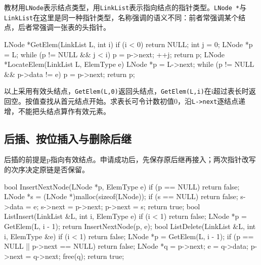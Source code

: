 教材用\texttt{LNode}表示结点类型，用\texttt{LinkList}表示指向结点的指针类型。\texttt{LNode *\allowbreak{}}与\texttt{LinkList}在这里是同一种指针类型，名称强调的语义不同：前者常强调某个结点，后者常强调一张表的头指针。

\par\medskip\noindent\begin{minipage}{\linewidth}
\begin{codeblock}[language=C++]
LNode *GetElem(LinkList L, int i) {
    if (i < 0) return NULL;
    int j = 0;
    LNode *p = L;
    while (p != NULL && j < i) {
        p = p->next;
        ++j;
    }
    return p;
}
LNode *LocateElem(LinkList L, ElemType e) {
    LNode *p = L->next;
    while (p != NULL && p->data != e) p = p->next;
    return p;
}
\end{codeblock}
\end{minipage}\par\medskip

以上采用有效头结点，\texttt{GetElem(\allowbreak{}L,\allowbreak{}0)\allowbreak{}}返回头结点，\texttt{GetElem(\allowbreak{}L,\allowbreak{}i)\allowbreak{}}在i超过表长时返回空。按值查找从首元结点开始。求表长可令计数初值0，沿\texttt{L->\allowbreak{}next}逐结点递增，不能把头结点算作有效元素。

\subsection{后插、按位插入与删除后继}\label{DS02-link-update}

后插的前提是p指向有效结点。申请成功后，先保存原后继再接入；两次指针改写的次序决定原链是否保留。

\par\medskip\noindent\begin{minipage}{\linewidth}
\begin{codeblock}[language=C++]
bool InsertNextNode(LNode *p, ElemType e) {
    if (p == NULL) return false;
    LNode *s = (LNode *)malloc(sizeof(LNode));
    if (s == NULL) return false;
    s->data = e;
    s->next = p->next;
    p->next = s;
    return true;
}
bool ListInsert(LinkList &L, int i, ElemType e) {
    if (i < 1) return false;
    LNode *p = GetElem(L, i - 1);
    return InsertNextNode(p, e);
}
bool ListDelete(LinkList &L, int i, ElemType &e) {
    if (i < 1) return false;
    LNode *p = GetElem(L, i - 1);
    if (p == NULL || p->next == NULL) return false;
    LNode *q = p->next;
    e = q->data;
    p->next = q->next;
    free(q);
    return true;
}
\end{codeblock}
\end{minipage}\par\medskip


